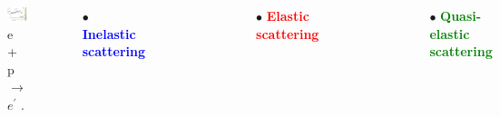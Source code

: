 \documentclass[12pt]{beamer}
\begin{document}

\begin{frame}
\begin{columns}[c] %
	\begin{figure}[]
		\centering
		\includegraphics[width=5cm]{../images/Thesis/elasticspectrum_2.png}
		\caption*{e + p $\rightarrow$ $e^{\prime}$ \cite{deltaIsobar}.}
		\label{wspect}
	\end{figure}
	
	$\bullet$ \textbf{\textcolor{blue}{Inelastic scattering}}\\
	
	\begin{figure}[]
		\includegraphics[width=4cm]{../images/ele_draw.png}
	\end{figure}
	
	
	$\bullet$ \textbf{\textcolor{red}{Elastic scattering}}\\
	
	\begin{figure}[]
		\includegraphics[width=4cm]{../images/ele_draw.png}
	\end{figure}
	$\bullet$ \textbf{\textcolor{green}{Quasi-elastic scattering}}\\
	
	\begin{figure}[]
		\includegraphics[width=4cm]{../images/ele_draw.png}
	\end{figure}	
	
	
\end{columns}
\end{frame}
\end{document}
